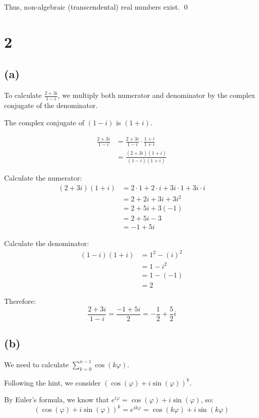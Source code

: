 \documentclass[12pt,a4paper]{article}
\theoremstyle{definition}
\theoremstyle{remark}
\begin{document}
Thus, non-algebraic (transcendental) real numbers exist. \qed


\section*{2}

\subsection*{(a)}

To calculate $\frac{2+3i}{1-i}$, we multiply both numerator and denominator by the complex conjugate of the denominator.

The complex conjugate of $(1-i)$ is $(1+i)$.

\begin{align}
\frac{2+3i}{1-i} &= \frac{2+3i}{1-i} \cdot \frac{1+i}{1+i}\\
&= \frac{(2+3i)(1+i)}{(1-i)(1+i)}
\end{align}

Calculate the numerator:
\begin{align}
(2+3i)(1+i) &= 2 \cdot 1 + 2 \cdot i + 3i \cdot 1 + 3i \cdot i\\
&= 2 + 2i + 3i + 3i^2\\
&= 2 + 5i + 3(-1)\\
&= 2 + 5i - 3\\
&= -1 + 5i
\end{align}

Calculate the denominator:
\begin{align}
(1-i)(1+i) &= 1^2 - (i)^2\\
&= 1 - i^2\\
&= 1 - (-1)\\
&= 2
\end{align}

Therefore:
$$\frac{2+3i}{1-i} = \frac{-1 + 5i}{2} = -\frac{1}{2} + \frac{5}{2}i$$




\subsection*{(b)}

We need to calculate $\sum_{k=0}^{n-1} \cos(k\varphi)$.

Following the hint, we consider $(\cos(\varphi) + i \sin(\varphi))^k$.

By Euler's formula, we know that $e^{i\varphi} = \cos(\varphi) + i\sin(\varphi)$, so:
$$(\cos(\varphi) + i \sin(\varphi))^k = e^{ik\varphi} = \cos(k\varphi) + i\sin(k\varphi)$$
\end{document}
